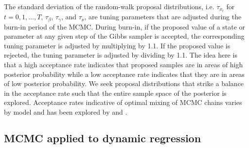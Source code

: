 The standard deviation of the random-walk proposal distributions, i.e. $\tau_{x_t}$ for $t = 0,1,\ldots,T$, $\tau_{\beta}$, $\tau_{\gamma}$, and $\tau_{\nu}$, are tuning parameters that are adjusted during the burn-in period of the MCMC. During burn-in, if the proposed value of a state or parameter at any given step of the Gibbs sampler is accepted, the corresponding tuning parameter is adjusted by multiplying by 1.1. If the proposed value is rejected, the tuning parameter is adjusted by dividing by 1.1. The idea here is that a high acceptance rate indicates that proposed samples are in areas of high posterior probability while a low acceptance rate indicates that they are in areas of low posterior probability. We seek proposal distributions that strike a balance in the acceptance rate such that the entire sample space of the posterior is explored. Acceptance rates indicative of optimal mixing of MCMC chains varies by model and has been explored by \citet{Robe:Gel:gilks:1997:optmh} and \citet{bed:2008:optmh}.

\subsection{MCMC applied to dynamic regression \label{sec:mcmc:dr}}


